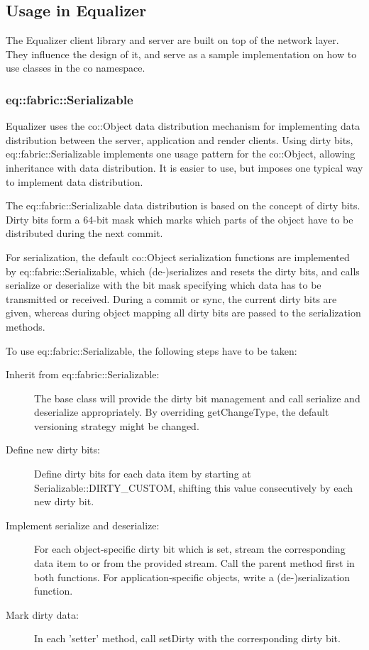 \documentclass[10pt,a4]{scrartcl}
\begin{document}
\subsection{\label{sNetUsage}Usage in Equalizer}

The Equalizer client library and server are built on top of the network
layer. They influence the design of it, and serve as a sample
implementation on how to use classes in the \textsf{co} namespace.

\subsubsection{\label{sEqObject}eq::fabric::Serializable}

Equalizer uses the \textsf{co::Object} data distribution mechanism for
implementing data distribution between the server, application and render
clients. Using dirty bits, \textsf{eq::fabric::Serializable} implements one
usage pattern for the \textsf{co::Object}, allowing inheritance with data
distribution. It is easier to use, but imposes one typical way to implement data
distribution.

The \textsf{eq::fabric::Serializable} data distribution is based on the concept
of dirty bits. Dirty bits form a 64-bit mask which marks which parts of the
object have to be distributed during the next commit.

For serialization, the default \textsf{co::Object} serialization functions are
implemented by \textsf{eq::fabric::Serializable}, which (de-)serializes and
resets the dirty bits, and calls \textsf{serialize} or \textsf{deserialize} with
the bit mask specifying which data has to be transmitted or received. During a
commit or sync, the current dirty bits are given, whereas during object mapping
all dirty bits are passed to the serialization methods.

To use \textsf{eq::fabric::Serializable}, the following steps have to be taken:

\begin{description}
\item[Inherit from \textsf{eq::fabric::Serializable}:] The base class will
  provide the dirty bit management and call serialize and deserialize
  appropriately. By overriding \textsf{get\-Chan\-ge\-Type}, the default
  versioning strategy might be changed.
\item[Define new dirty bits:] Define dirty bits for each data item by
  starting at \textsf{Serializable::DIRTY\_CUSTOM}, shifting this value
  consecutively by each new dirty bit.
\item[Implement serialize and deserialize:] For each object-specific
  dirty bit which is set, stream the corresponding data item to or from
  the provided stream. Call the parent method first in both
  functions. For application-specific objects, write a (de-)serialization
  function.
\item[Mark dirty data:] In each 'setter' method, call \textsf{setDirty}
  with the corresponding dirty bit.
\end{description}
\end{document}
